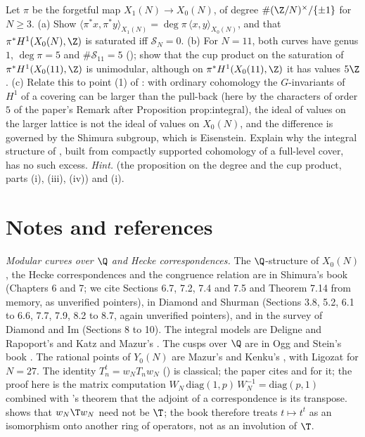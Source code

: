 \begin{exercise}[harder]\label{ex:moddeg:ex-shimura}
Let $\pi$ be the forgetful map $X_1(N)\to X_0(N)$, of degree $\#(\Z/N)^\times/\{\pm1\}$ for $N\ge3$. (a) Show $\langle\pi^*x,\pi^*y\rangle_{X_1(N)}=\deg\pi\,\langle x,y\rangle_{X_0(N)}$, and that
$\pi^*H^1(X_0(N),\Z)$ is saturated iff $\mathcal S_N=0$. (b) For $N=11$, both curves have genus $1$, $\deg\pi=5$ and $\#\mathcal S_{11}=5$ (); show that the cup product on the
saturation of $\pi^*H^1(X_0(11),\Z)$ is unimodular, although on $\pi^*H^1(X_0(11),\Z)$ it has values $5\Z$. (c) Relate this to point (1) of : with ordinary cohomology the $G$-invariants of $H^1$ of a covering can be larger than the pull-back (here by the characters of
order $5$ of the paper's Remark after Proposition prop:integral), the ideal of values on the larger lattice is not the ideal of values on $X_0(N)$, and the difference is governed by the Shimura
subgroup, which is Eisenstein. Explain why the integral structure of \cite{DFG04}, built from compactly supported cohomology of a full-level cover, has no such excess.
\emph{Hint.}  (the proposition on the degree and the cup product, parts (i), (iii), (iv)) and (i).
\end{exercise}

\section{Notes and references}\label{sec:moddeg:notes}

\emph{Modular curves over $\Q$ and Hecke correspondences.} The $\Q$-structure of $X_0(N)$, the Hecke correspondences and the congruence relation are in Shimura's book \cite{Shimura71} (Chapters 6
and 7; we cite Sections 6.7, 7.2, 7.4 and 7.5 and Theorem 7.14 from memory, as unverified pointers), in Diamond and Shurman \cite{DiamondShurman} (Sections 3.8, 5.2, 6.1 to 6.6, 7.7, 7.9, 8.2 to 8.7, again
unverified pointers), and in the survey of Diamond and Im \cite{DiamondIm} (Sections 8 to 10). The integral models are Deligne and Rapoport's \cite{DeligneRapoport73} and Katz and Mazur's \cite{KatzMazur85}. The
cusps over $\Q$ are in Ogg \cite{Ogg73} and Stein's book \cite{Stein}. The rational points of $Y_0(N)$ are Mazur's \cite{Mazur78} and Kenku's \cite{Kenku79,Kenku80a,Kenku80b,Kenku81}, with Ligozat
\cite{Ligozat75} for $N=27$. The identity $T_n^t=w_NT_nw_N$ () is classical; the paper cites \cite[\S\S1.6.1, 1.8.2]{DFG04} and \cite[\S4.4]{DDT} for it; the proof here is
the matrix computation $W_N\,\mathrm{diag}(1,p)\,W_N^{-1}=\mathrm{diag}(p,1)$ combined with 's theorem that the adjoint of a correspondence is its transpose.  shows that
$w_N\T w_N$ need not be $\T$; the book therefore treats $t\mapsto t^t$ as an isomorphism onto another ring of operators, not as an involution of $\T$.

